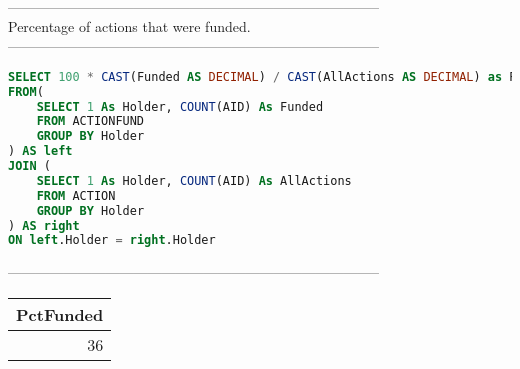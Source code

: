 --------------------------------------------------------------------------------
\\Percentage of actions that were funded.\\
--------------------------------------------------------------------------------
\begin{lstlisting}[language = SQL]
SELECT 100 * CAST(Funded AS DECIMAL) / CAST(AllActions AS DECIMAL) as PctFunded 
FROM(
	SELECT 1 As Holder, COUNT(AID) As Funded 
	FROM ACTIONFUND 
	GROUP BY Holder
) AS left 
JOIN (
	SELECT 1 As Holder, COUNT(AID) As AllActions 
	FROM ACTION 
	GROUP BY Holder
) AS right 
ON left.Holder = right.Holder
\end{lstlisting}
--------------------------------------------------------------------------------
\\\begin{tabular}{r}
\toprule
   PctFunded \\
\midrule
          36 \\
\bottomrule
\end{tabular}